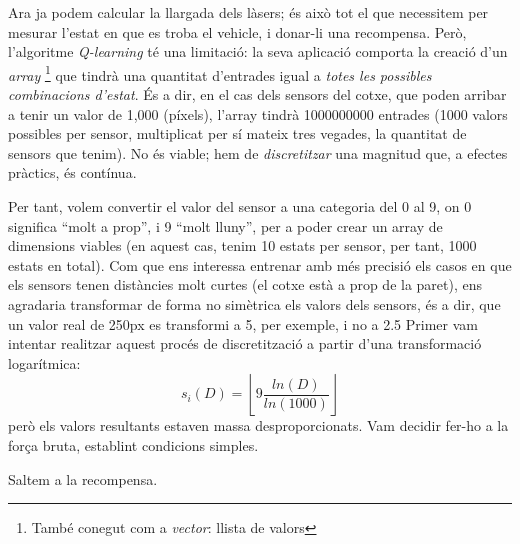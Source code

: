 Ara ja podem calcular la llargada dels làsers; és això tot el que necessitem per mesurar l'estat
en que es troba el vehicle, i donar-li una recompensa. Però, l'algoritme \emph{Q-learning} té una limitació: la seva aplicació
comporta la creació d'un \emph{array} \footnote{També conegut com a \emph{vector}: llista de valors}
que tindrà una quantitat d'entrades igual a \emph{totes les possibles combinacions d'estat}. És a dir,
en el cas dels sensors del cotxe, que poden arribar a tenir un valor de 1,000 (píxels), l'array
tindrà \num{1000000000} entrades (1000 valors possibles per sensor, multiplicat per sí mateix tres vegades, la quantitat
de sensors que tenim). No és viable; hem de \emph{discretitzar} una magnitud que, a efectes pràctics, és contínua.

Per tant, volem convertir el valor del sensor a una categoria del 0 al 9, on 0 significa ``molt a prop'', i 9 ``molt lluny'',
per a poder crear un array de dimensions viables (en aquest cas, tenim 10 estats per sensor, per tant, 1000 estats en total).
Com que ens interessa entrenar amb més precisió els casos en que els sensors tenen distàncies molt curtes (el cotxe està a 
prop de la paret), ens agradaria transformar de forma no simètrica els valors dels sensors, és a dir, que un valor real de
250px es transformi a 5, per exemple, i no a 2.5
Primer vam intentar realitzar aquest procés de discretització a partir d'una transformació logarítmica:
\[
s_i(D) = \left\lfloor 9 \frac{ln(D)}{ln(1000)} \right\rfloor
\]
però els valors resultants estaven massa desproporcionats. Vam decidir fer-ho a la força bruta, establint condicions
simples. 

Saltem a la recompensa.














